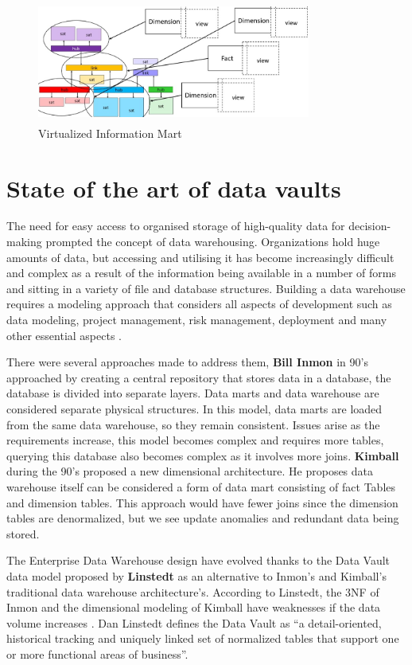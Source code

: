 \documentclass[conference]{IEEEtran}
\begin{document}
\begin{figure}[htbp]
\centerline{\includegraphics[width=9cm, height=4cm]{Figure3.png}}
\caption{Virtualized Information Mart}
\label{fig3}
\end{figure}


\section{State of the art of data vaults}

The need for easy access to organised storage of high-quality data for decision-making prompted the concept of data warehousing. Organizations hold huge amounts of data, but accessing and utilising it has become increasingly difficult and complex as a result of the information being available in a number of forms and sitting in a variety of file and database structures. Building a data warehouse requires a modeling approach that considers all aspects of development such as data modeling, project management, risk management, deployment and many other essential aspects \cite{b2}.

There were several approaches made to address them, \textbf{Bill Inmon} in 90's approached by creating a central repository that stores data in a database, the database is divided into separate layers. Data marts and data warehouse are considered separate physical structures. In this model, data marts are loaded from the same data warehouse, so they remain consistent. Issues arise as the requirements increase, this model becomes complex and requires more tables, querying this database also becomes complex as it involves more joins. \textbf{Kimball} during the 90's proposed a new dimensional architecture. He proposes data warehouse itself can be considered a form of data mart consisting of fact Tables and dimension tables. This approach would have fewer joins since the dimension tables are denormalized, but we see update anomalies and redundant data being stored.

The Enterprise Data Warehouse design have evolved thanks to the Data Vault data model proposed by \textbf{Linstedt} as an alternative to Inmon's and Kimball's traditional data warehouse architecture's. According to Linstedt, the 3NF of Inmon and the dimensional modeling of Kimball have weaknesses if the data volume increases \cite{b3}. Dan Linstedt defines the Data Vault as “a detail-oriented, historical tracking and uniquely linked set of normalized tables that support one or more functional areas of business”.
\end{document}

